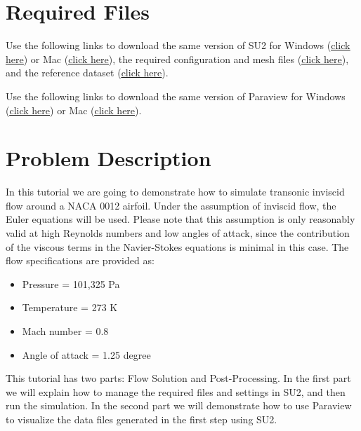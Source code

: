 \section{Required Files}
\begin{su2note}
	Use the following links to download the same version of SU2 for Windows (\href{https://users.encs.concordia.ca/~bvermeir/book/executables/windows/SU2_Windows.zip}{\underline{click here}}) or Mac (\href{https://users.encs.concordia.ca/~bvermeir/book/executables/osx/SU2_Mac.zip}{\underline{click here}}), the required configuration and mesh files (\href{https://gitlab.com/bvermeir/book-cfd/blob/master/tutorial/tut1_inviscid_naca0012/naca0012.zip}{\underline{click here}}), and the reference dataset (\href{https://gitlab.com/bvermeir/book-cfd/blob/master/tutorial/tut1_inviscid_naca0012/experimental_values.zip}{\underline{click here}}).
\end{su2note}
\begin{paraviewnote}
	Use the following links to download the same version of Paraview for Windows (\href{https://users.encs.concordia.ca/~bvermeir/book/executables/windows/ParaView-5.4.0-Qt5-OpenGL2-Windows-64bit.exe}{\underline{click here}}) or Mac (\href{https://users.encs.concordia.ca/~bvermeir/book/executables/osx/ParaView-5.4.0-Qt5-OpenGL2-MPI-OSX10.8-64bit.dmg}{\underline{click here}}).
\end{paraviewnote}

\section{Problem Description}
In this tutorial we are going to demonstrate how to simulate transonic inviscid flow around a NACA 0012 airfoil. Under the assumption of inviscid flow, the Euler equations will be used. Please note that this assumption is only reasonably valid at high Reynolds numbers and low angles of attack, since the contribution of the viscous terms in the Navier-Stokes equations is minimal in this case. The flow specifications are provided as:
\begin{itemize}
    \item Pressure = 101,325 Pa
    \item Temperature = 273 K
    \item Mach number = 0.8
    \item Angle of attack = 1.25 degree
\end{itemize}
This tutorial has two parts: Flow Solution and Post-Processing. In the first part we will explain how to manage the required files and settings in SU2, and then run the simulation. In the second part we will demonstrate how to use Paraview to visualize the data files generated in the first step using SU2.
